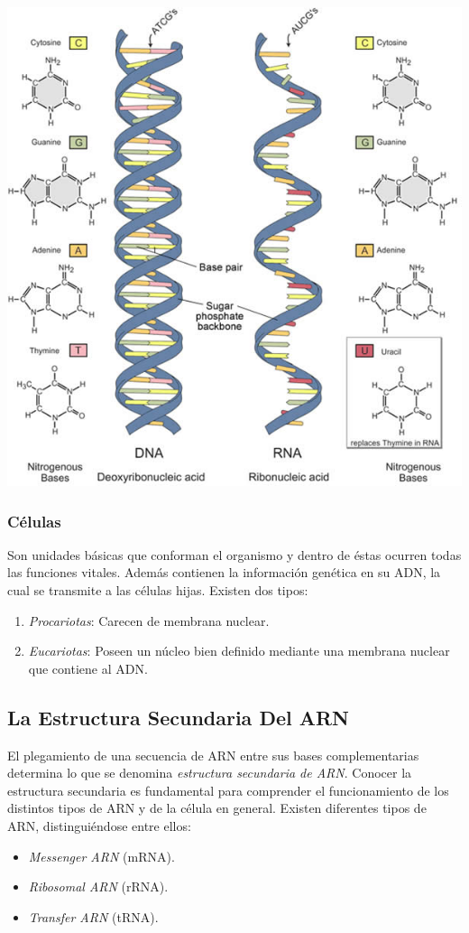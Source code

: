   \includegraphics[width=\linewidth]{images/dna_rna.png}

  \subsubsection{C\'elulas}
  Son unidades b\'asicas que conforman el organismo y dentro de \'estas ocurren todas las funciones vitales. Adem\'as contienen la informaci\'on gen\'etica en su ADN, la cual se transmite a las c\'elulas hijas. Existen dos tipos:
  \begin{enumerate}
    \item \textit{Procariotas}: Carecen de membrana nuclear.
    \item \textit{Eucariotas}: Poseen un n\'ucleo bien definido mediante una membrana nuclear que contiene al ADN.
  \end{enumerate}

  \subsection{La Estructura Secundaria Del ARN}\label{estructuraSecundariaARN}
  El plegamiento de una secuencia de ARN entre sus bases complementarias determina lo que se denomina \emph{estructura secundaria de ARN}. Conocer la 
  estructura secundaria es fundamental para comprender el funcionamiento de los distintos tipos de ARN y de la c\'elula en general. Existen diferentes
  tipos de ARN, distingui\'endose entre ellos:
  \begin{itemize}
    \item \textit{Messenger ARN} (mRNA).
    \item \textit{Ribosomal ARN} (rRNA).
    \item \textit{Transfer ARN} (tRNA).
  \end{itemize}


